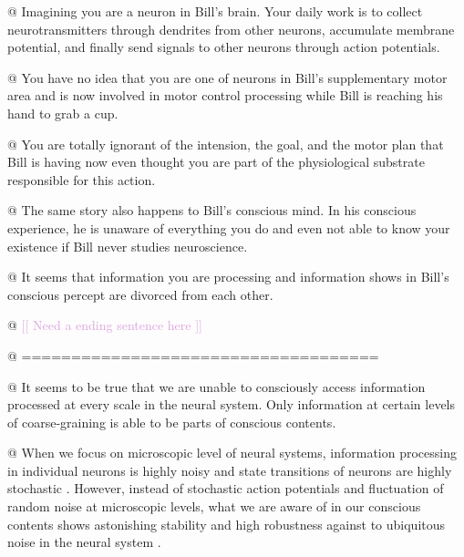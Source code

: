 \documentclass[utf8]{article}
\newenvironment{ants}
			{
			 \begin{easylist}[itemize]
			}
			{
			\end{easylist}
			}
\newcommand{\idea}[1]{\noindent
				\textcolor{Plum}{[[ #1 ]]}}
\begin{document}
		\begin{ants}
			
				@ Imagining you are a neuron in Bill's brain. Your daily work is to collect neurotransmitters through dendrites from other neurons, accumulate membrane potential, and finally send signals to other neurons through action potentials. 
				
				@ You have no idea that you are one of neurons in Bill's supplementary motor area and is now involved in motor control processing while Bill is reaching his hand to grab a cup. 
				
				@ You are totally ignorant of the intension, the goal, and the motor plan that Bill is having now even thought you are part of the physiological substrate responsible for this action. 
				
				@ The same story also happens to Bill's conscious mind. In his conscious experience, he is unaware of everything you do and even not able to know your existence if Bill never studies neuroscience.
				
				@ It seems that information you are processing and information shows in Bill's conscious percept are divorced from each other. 
				
				@ \idea{Need a ending sentence here}
				
				@ ====================================
				
				
													
			
			
				
				@ It seems to be true that we are unable to consciously access information processed at every scale in the neural system. Only information at certain levels of coarse-graining is able to be parts of conscious contents. 
				
				@ When we focus on microscopic level of neural systems, information processing in individual neurons is highly noisy and state transitions of neurons are highly stochastic \citep{Goldwyn2011, White2000}. However, instead of stochastic action potentials and fluctuation of random noise at microscopic levels, what we are aware of in our conscious contents shows astonishing stability and high robustness against to ubiquitous noise in the neural system \citep{mathis1995computational}.
				

\end{ants}
\end{document}
